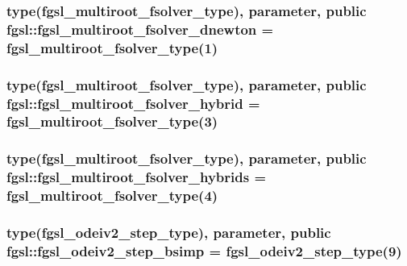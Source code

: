 \hypertarget{classfgsl_a1621295c3bf584aab577fe54f3a89fb0}{
\subsubsection[{fgsl\-\_\-multiroot\-\_\-fsolver\-\_\-dnewton}]{\setlength{\rightskip}{0pt plus 5cm}type({\bf fgsl\-\_\-multiroot\-\_\-fsolver\-\_\-type}), parameter, public fgsl\-::fgsl\-\_\-multiroot\-\_\-fsolver\-\_\-dnewton = {\bf fgsl\-\_\-multiroot\-\_\-fsolver\-\_\-type}(1)}}\label{classfgsl_a1621295c3bf584aab577fe54f3a89fb0}
\hypertarget{classfgsl_acca2b12319b40798b2dc4dd347fcc4b5}{
\subsubsection[{fgsl\-\_\-multiroot\-\_\-fsolver\-\_\-hybrid}]{\setlength{\rightskip}{0pt plus 5cm}type({\bf fgsl\-\_\-multiroot\-\_\-fsolver\-\_\-type}), parameter, public fgsl\-::fgsl\-\_\-multiroot\-\_\-fsolver\-\_\-hybrid = {\bf fgsl\-\_\-multiroot\-\_\-fsolver\-\_\-type}(3)}}\label{classfgsl_acca2b12319b40798b2dc4dd347fcc4b5}
\hypertarget{classfgsl_abd283e94024c75208f98eb64fd4a8833}{
\subsubsection[{fgsl\-\_\-multiroot\-\_\-fsolver\-\_\-hybrids}]{\setlength{\rightskip}{0pt plus 5cm}type({\bf fgsl\-\_\-multiroot\-\_\-fsolver\-\_\-type}), parameter, public fgsl\-::fgsl\-\_\-multiroot\-\_\-fsolver\-\_\-hybrids = {\bf fgsl\-\_\-multiroot\-\_\-fsolver\-\_\-type}(4)}}\label{classfgsl_abd283e94024c75208f98eb64fd4a8833}
\hypertarget{classfgsl_a6c2cfecdf8c9901ed22feb4c9fdef384}{
\subsubsection[{fgsl\-\_\-odeiv2\-\_\-step\-\_\-bsimp}]{\setlength{\rightskip}{0pt plus 5cm}type({\bf fgsl\-\_\-odeiv2\-\_\-step\-\_\-type}), parameter, public fgsl\-::fgsl\-\_\-odeiv2\-\_\-step\-\_\-bsimp = {\bf fgsl\-\_\-odeiv2\-\_\-step\-\_\-type}(9)}}\label{classfgsl_a6c2cfecdf8c9901ed22feb4c9fdef384}
